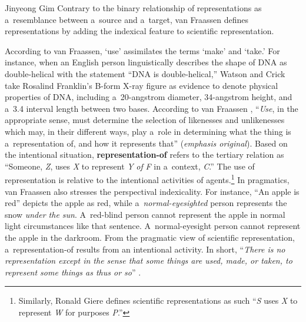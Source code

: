 \begin{artengenv}{Jinyeong Gim}
Contrary to the binary relationship of representations as a~resemblance between a~source and a~target, van Fraassen defines representations by adding the indexical feature to scientific representation.

According to van Fraassen, ‘use' assimilates the terms ‘make' and ‘take.' For instance, when an English person linguistically describes the shape of DNA as double-helical with the statement ``DNA is double-helical,'' Watson and Crick take Rosalind Franklin's B-form X-ray figure as evidence to denote physical properties of DNA, including a~20-angstrom diameter, 34-angstrom height, and a~3.4 interval length between two bases. According to van Fraassen
\parencite*[][p.23]{van_fraassen_scientific_2008}, %
 ``\textit{Use}, in the appropriate sense, must determine the selection of likenesses and unlikenesses which may, in their different ways, play a~role in determining what the thing is a~representation of, and how it represents that'' (\textit{emphasis original}). Based on the intentional situation, \textbf{representation-of} refers to the tertiary relation as ``Someone, \textit{Z}, uses \textit{X} to represent \textit{Y} \textit{of} \textit{F} in a~context, \textit{C}.'' The use of representation is relative to the intentional activities of agents.\footnote{Similarly, Ronald Giere 
\parencite*[][p.60]{giere_scientific_2006} %
 defines scientific representations as such ``\textit{S} uses \textit{X} to represent \textit{W} for purposes \textit{P}.''} In pragmatics, van Fraassen also stresses the perspectival indexicality. For instance, ``An apple is red'' depicts the apple as red, while a~\textit{normal-eyesighted} person represents the snow \textit{under the sun}. A~red-blind person cannot represent the apple in normal light circumstances like that sentence. A~normal-eyesight person cannot represent the apple in the darkroom. From the pragmatic view of scientific representation, a~representation-of results from an intentional activity. In short, ``\textit{There is no representation except in the sense that some things are used, made, or taken, to represent some things as thus or so}'' 
\parencite[][emphases original]{van_fraassen_scientific_2008}.%



\end{artengenv}
